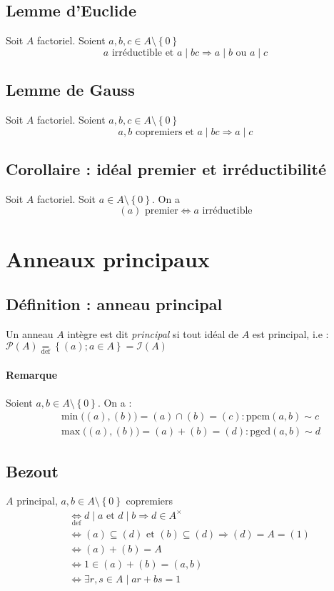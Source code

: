 \documentclass[reqno,a4paper,10pt]{report}
\newcommand{\set}[1]{\left\lbrace #1 \right\rbrace} %
\newcommand{\so}{\Rightarrow}
\newcommand{\soo}{\Longrightarrow}
\newcommand{\pgcd}{\mathrm{pgcd}} %
\newcommand{\ppcm}{\mathrm{ppcm}}
\newcommand{\tdef}[1]{\underset{\text{def}}{ #1 }}
\newcommand{\et}{\text{ et }}
\newcommand{\ou}{\text{ ou }}
\begin{document}
\subsection{Lemme d'Euclide}
Soit $A$ factoriel. Soient $a,b,c \in A\setminus\set{0}$
\[a \text{ irréductible et } a \mid bc \soo a \mid b \ou a\mid c\]

\subsection{Lemme de Gauss}
Soit $A$ factoriel. Soient $a,b,c \in A\setminus\set{0}$
\[a, b \text{ copremiers et } a\mid bc \soo a\mid c\]
\begin{comment}
  Preuve 26/11/09 p2
\end{comment}

\subsection{Corollaire : idéal premier et irréductibilité}
Soit $A$ factoriel. Soit $a \in A\setminus\set{0}$. On a
\[(a) \text{ premier} \iff a \text{ irréductible}\]

\section{Anneaux principaux}
\subsection{Définition : anneau principal}
Un anneau $A$ intègre est dit \emph{principal} si tout idéal de $A$ est
principal, i.e : $\mathcal P(A)\tdef =\set{(a); a \in A} = \mathcal I(A)$

\paragraph{Remarque}
Soient $a,b \in A\setminus\set{0}$. On a :
\begin{eqnarray*}
  &\min\big( (a), (b)\big) = (a) \cap (b) = (c) : \ppcm(a,b) \sim c\\
  &\max\big( (a), (b)\big) = (a) + (b) = (d) : \pgcd(a,b) \sim d
\end{eqnarray*}

\subsection{Bezout}
$A$ principal, $a,b \in A\setminus\set{0}$ copremiers
\begin{align*}
  &\tdef{\iff} d \mid a \et d \mid b \so d \in A^\times\\
  &\iff (a) \subseteq (d) \et (b) \subseteq (d) \so (d)=A=(1)\\
  &\iff (a) + (b) = A\\ %
  &\iff 1 \in (a) + (b) = (a,b)\\
  &\iff \exists r,s \in A \mid ar+bs=1
\end{align*}
\end{document}

